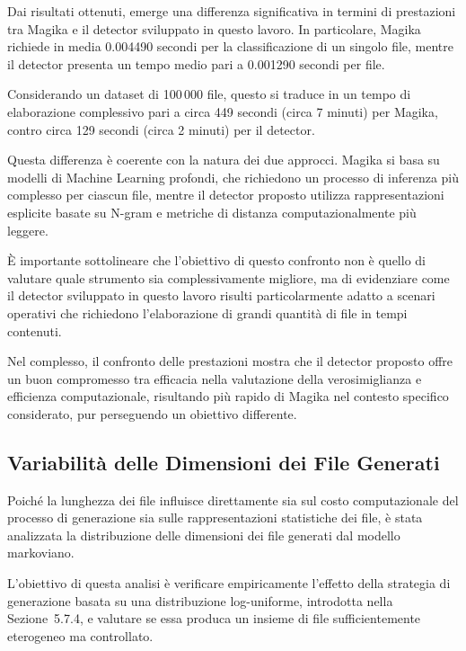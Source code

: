 \documentclass{report}
\begin{document}
\bigskip

Dai risultati ottenuti, emerge una differenza significativa in termini di
prestazioni tra Magika e il detector sviluppato in questo lavoro.
In particolare, Magika richiede in media 0.004490 secondi per la classificazione
di un singolo file, mentre il detector presenta un tempo medio pari a 0.001290
secondi per file.

\bigskip

Considerando un dataset di 100\,000 file, questo si traduce in un tempo di
elaborazione complessivo pari a circa 449 secondi (circa 7 minuti)
per Magika, contro circa 129 secondi (circa 2 minuti) per il detector.

\bigskip

Questa differenza è coerente con la natura dei due approcci.
Magika si basa su modelli di Machine Learning profondi, che richiedono un processo
di inferenza più complesso per ciascun file, mentre il detector proposto utilizza
rappresentazioni esplicite basate su N-gram e metriche di distanza computazionalmente
più leggere.

\bigskip

È importante sottolineare che l’obiettivo di questo confronto non è quello di
valutare quale strumento sia complessivamente migliore, ma di evidenziare come
il detector sviluppato in questo lavoro risulti particolarmente adatto a scenari
operativi che richiedono l’elaborazione di grandi quantità di file in tempi
contenuti.

\bigskip

Nel complesso, il confronto delle prestazioni mostra che il detector proposto
offre un buon compromesso tra efficacia nella valutazione della verosimiglianza e
efficienza computazionale, risultando più rapido di Magika nel contesto specifico
considerato, pur perseguendo un obiettivo differente.



\subsection{Variabilità delle Dimensioni dei File Generati}

Poiché la lunghezza dei file influisce direttamente sia sul costo computazionale
del processo di generazione sia sulle rappresentazioni statistiche dei file,
è stata analizzata la distribuzione delle dimensioni dei file generati
dal modello markoviano.

\bigskip

L’obiettivo di questa analisi è verificare empiricamente l’effetto della strategia
di generazione basata su una distribuzione log-uniforme, introdotta nella
Sezione~5.7.4, e valutare se essa produca un insieme di file sufficientemente
eterogeneo ma controllato.
\end{document}
